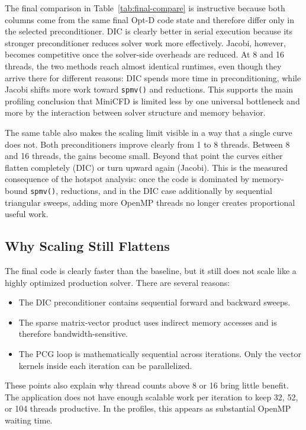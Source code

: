 \documentclass[10pt,firstlineindent,nopartpage,article,accentcolor=tud1b]{tudreport}
\begin{document}
The final comparison in Table~\ref{tab:final-compare} is instructive because
both columns come from the same final Opt-D code state and therefore differ
only in the selected preconditioner. DIC is clearly better in serial execution
because its stronger preconditioner reduces solver work more effectively.
Jacobi, however, becomes competitive once the solver-side overheads are
reduced. At 8 and 16 threads, the two methods reach almost identical runtimes,
even though they arrive there for different reasons: DIC spends more time in
preconditioning, while Jacobi shifts more work toward \texttt{spmv()} and
reductions. This supports the main profiling conclusion that MiniCFD is limited
less by one universal bottleneck and more by the interaction between solver
structure and memory behavior.

The same table also makes the scaling limit visible in a way that a single
curve does not. Both preconditioners improve clearly from 1 to 8 threads.
Between 8 and 16 threads, the gains become small. Beyond that point the curves
either flatten completely (DIC) or turn upward again (Jacobi). This is the
measured consequence of the hotspot analysis: once the code is dominated by
memory-bound \texttt{spmv()}, reductions, and in the DIC case additionally by
sequential triangular sweeps, adding more OpenMP threads no longer creates
proportional useful work.

\subsection{Why Scaling Still Flattens}
The final code is clearly faster than the baseline, but it still does not scale
like a highly optimized production solver. There are several reasons:
\begin{itemize}[leftmargin=*]
\item The DIC preconditioner contains sequential forward and backward sweeps.
\item The sparse matrix-vector product uses indirect memory accesses and is
therefore bandwidth-sensitive.
\item The PCG loop is mathematically sequential across iterations. Only the
vector kernels inside each iteration can be parallelized.
\end{itemize}

These points also explain why thread counts above 8 or 16 bring little benefit.
The application does not have enough scalable work per iteration to keep 32, 52,
or 104 threads productive. In the profiles, this appears as substantial OpenMP
waiting time.
\end{document}
